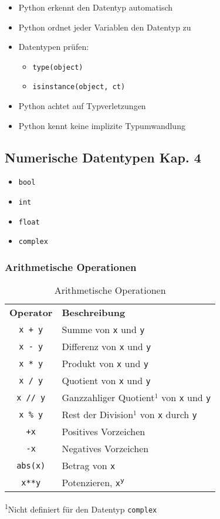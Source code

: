 \begin{itemize}
	\item Python erkennt den Datentyp automatisch
	\item Python ordnet jeder Variablen den Datentyp zu
	\item Datentypen prüfen:
	\begin{itemize}
		\item[\-] \texttt{type(object)}
		\item[\-] \texttt{isinstance(object, ct)}
	\end{itemize}
	\item Python achtet auf Typverletzungen
	\item Python kennt keine implizite Typumwandlung
\end{itemize}

\subsection[Numerische Datentypen]{Numerische Datentypen \tiny{Kap. 4}}
\begin{itemize}
	\item \texttt{bool}
	\item \texttt{int}
	\item \texttt{float}
	\item \texttt{complex}
\end{itemize}

\subsubsection{Arithmetische Operationen}
\begin{table}[H]
\begin{threeparttable}
	\caption{Arithmetische Operationen}
	\begin{tabular}{|c|l|}
		\hline 
		\textbf{Operator} &\textbf{Beschreibung}\\ 
		\texttt{x + y} &Summe von \texttt{x} und \texttt{y}\\ 
		\texttt{x - y} &Differenz von \texttt{x} und \texttt{y}\\ 
		\texttt{x * y} &Produkt von \texttt{x} und \texttt{y}\\ 
		\texttt{x / y} &Quotient von \texttt{x} und \texttt{y}\\  
		\texttt{x // y} &Ganzzahliger Quotient$^1$ von \texttt{x} und \texttt{y}\\ 
		\texttt{x \% y} &Rest der Division$^1$ von \texttt{x} durch \texttt{y}\\ 
		\texttt{+x} &Positives Vorzeichen\\ 
		\texttt{-x} &Negatives Vorzeichen\\ 
		\texttt{abs(x)} &Betrag von \texttt{x}\\ 
		\texttt{x**y} &Potenzieren, \texttt{x\textsuperscript{y}}\\ 
		\hline 
	\end{tabular}
\textsuperscript{1}Nicht definiert für den Datentyp \texttt{complex}
\end{threeparttable}
\end{table}

